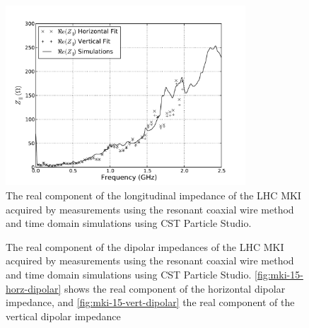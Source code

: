 \begin{figure}
\begin{center}
\includegraphics[width=0.8\textwidth]{LHC_MKI/figures/mki_15_sims_meas_long.pdf}
\end{center}
\caption{The real component of the longitudinal impedance of the LHC MKI acquired by measurements using the resonant coaxial wire method and time domain simulations using CST Particle Studio.}
\label{fig:mki-15-longitudinal}
\end{figure}

\begin{figure}
\caption{The real component of the dipolar impedances of the LHC MKI acquired by measurements using the resonant coaxial wire method and time domain simulations using CST Particle Studio. \ref{fig:mki-15-horz-dipolar} shows the real component of the horizontal dipolar impedance, and \ref{fig:mki-15-vert-dipolar} the real component of the vertical dipolar impedance}
\label{fig:mki-15-dipolar}
\end{figure}

